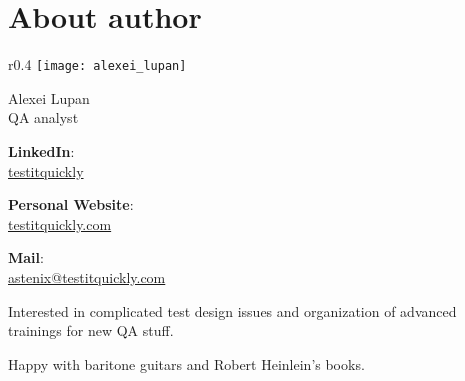 \section*{About author}
\label{sec:About author}

\begingroup

\setlength{\intextsep}{-0.4em}
\setlength{\columnsep}{3em}

\begin{wrapfigure}[2]{r}{0.4\linewidth}
  \centering\texttt{[image: alexei\_lupan]}
\end{wrapfigure}

{\Large Alexei Lupan}\\
QA analyst

\textbf{LinkedIn}:\\
\href{https://www.linkedin.com/in/testitquickly/}{testitquickly}

\textbf{Personal Website}:\\
\href{https://testitquickly.com/}{testitquickly.com}
 
\textbf{Mail}:\\
\href{mailto:astenix@testitquickly.com}{astenix@testitquickly.com} 


Interested in complicated test design issues and organization of advanced trainings for new QA stuff.

Happy with baritone guitars and Robert Heinlein's books.                                                                                                                                                                                                    

\endgroup
